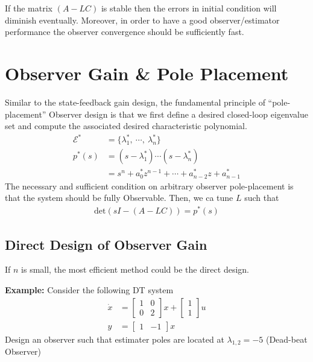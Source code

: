 \documentclass[twoside]{article}
\begin{document}
If the matrix $\left( A - L C \right)$ is stable then the errors in
initial condition will diminish eventually. Moreover, in order
to have a good observer/estimator performance the observer
convergence should be sufficiently fast. 

\newpage

\section*{Observer Gain \& Pole Placement}

Similar to the state-feedback gain design,
the fundamental principle of ``pole-placement'' Observer design is that
we first define a desired closed-loop eigenvalue set and 
compute the associated desired characteristic polynomial. 
%
\begin{align*}
 \mathcal{E}^* &= \lbrace \lambda_1^* , \ \cdots, \  \lambda_n^*
                 \rbrace
  \\
  p^*(s) &= \left( s - \lambda_1^* \right) \cdots \left( s - \lambda_n^*
         \right)                         
  \\
  &= s^n + a_0^* z^{n-1} + \cdots + a_{n-2}^* z + a_{n-1}^*
\end{align*}
%
The necessary and sufficient condition on arbitrary observer pole-placement
is that the system should be fully Observable. Then, we ca tune $L$ such
that 
%
\begin{align*}
  \mathrm{det} \left( s I - ( A - L C ) \right) = p^*(s)
\end{align*}
%
\subsection*{Direct Design of Observer Gain}

If $n$ is small, the most efficient method could be the direct
design. 

\textbf{Example:} Consider the following DT system
%
\begin{align*}
 \dot{x} &= \left[ \begin{array}{cc} 1 & 0 \\ 0 & 2 \end{array} \right] x
    + \left[ \begin{array}{c} 1 \\ 1 \end{array} \right] u
\\
 y &= \left[ \begin{array}{cc} 1 & -1 \end{array} \right] x
\end{align*}
% 
Design an observer such that estimater poles are located at 
$\lambda_{1,2} = -5$ (Dead-beat Observer)
\end{document}
